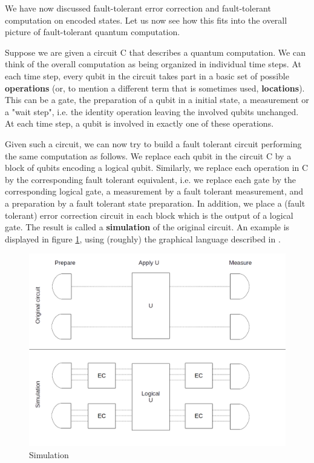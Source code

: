 \documentclass[a4paper, draft]{article}
\theoremstyle{own}
\theoremstyle{remark}
\begin{document}
We have now discussed fault-tolerant error correction and fault-tolerant computation on encoded states. Let us now see how this fits into the overall picture of fault-tolerant quantum computation.

Suppose we are given a circuit C that describes a quantum computation. We can think of the overall computation as being organized in individual time steps. At each time step, every qubit in the circuit takes part in a basic set of possible {\bf 
operations} (or, to mention a different term that is sometimes used, {\bf locations}).
This can be a gate, the preparation of a qubit in a initial state, a measurement or a "wait step", i.e. the identity operation leaving the involved qubits unchanged. At each time step, a qubit is involved in exactly one of these operations.

Given such a circuit, we can now try to build a fault tolerant circuit performing the same computation as follows. We replace each qubit in the circuit C by a block of qubits encoding a logical qubit. Similarly, we replace each operation in C by the corresponding fault tolerant equivalent, i.e. we replace each gate by the corresponding logical gate, a measurement by a fault tolerant measurement, and a preparation by a fault tolerant state preparation. In addition, we place a (fault tolerant) error correction circuit in each block which is the output of a logical gate. The result is called a {\bf simulation} of the original circuit. An example is displayed in figure \ref{fig:Simulation}, using (roughly) the graphical language described in \cite{G1}. 


\begin{figure}[ht]
\centering
\includegraphics[width=0.7\linewidth]{images/Simulation}
\caption[Simulation]{Simulation}
\label{fig:Simulation}
\end{figure}
\end{document}
